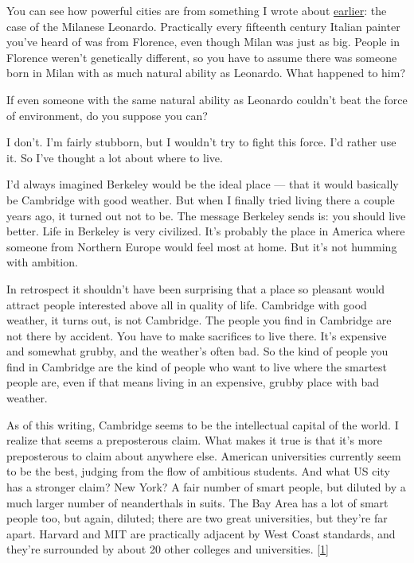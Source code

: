 You can see how powerful cities are from
                  something I wrote about \href{http://www.paulgraham.com/taste.html}{earlier}: the
                  case of the Milanese Leonardo. Practically every fifteenth
                  century Italian painter you've heard of was from Florence,
                  even though Milan was just as big. People in Florence weren't
                  genetically different, so you have to assume there was someone
                  born in Milan with as much natural ability as Leonardo. What
                  happened to him?

If even someone with the same
                  natural ability as Leonardo couldn't beat the force of
                  environment, do you suppose you can?

I don't. I'm
                  fairly stubborn, but I wouldn't try to fight this force. I'd
                  rather use it. So I've thought a lot about where to live.

I'd
                  always imagined Berkeley would be the ideal place --- that
                  it would basically be Cambridge with good weather. But when I
                  finally tried living there a couple years ago, it turned out
                  not to be. The message Berkeley sends is: you should live
                  better. Life in Berkeley is very civilized. It's probably the
                  place in America where someone from Northern Europe would feel
                  most at home. But it's not humming with ambition.

In
                  retrospect it shouldn't have been surprising that a place so
                  pleasant would attract people interested above all in quality
                  of life. Cambridge with good weather, it turns out, is not
                  Cambridge. The people you find in Cambridge are not there by
                  accident. You have to make sacrifices to live there. It's
                  expensive and somewhat grubby, and the weather's often bad. So
                  the kind of people you find in Cambridge are the kind of
                  people who want to live where the smartest people are, even if
                  that means living in an expensive, grubby place with bad
                  weather.

As of this writing, Cambridge seems to be
                  the intellectual capital of the world. I realize that seems a
                  preposterous claim. What makes it true is that it's more
                  preposterous to claim about anywhere else. American
                  universities currently seem to be the best, judging from the
                  flow of ambitious students. And what US city has a stronger
                  claim? New York? A fair number of smart people, but diluted by
                  a much larger number of neanderthals in suits. The Bay Area
                  has a lot of smart people too, but again, diluted; there are
                  two great universities, but they're far apart. Harvard and MIT
                  are practically adjacent by West Coast standards, and they're
                  surrounded by about 20 other colleges and universities.
                  [\href{\#f1n}{1}]

